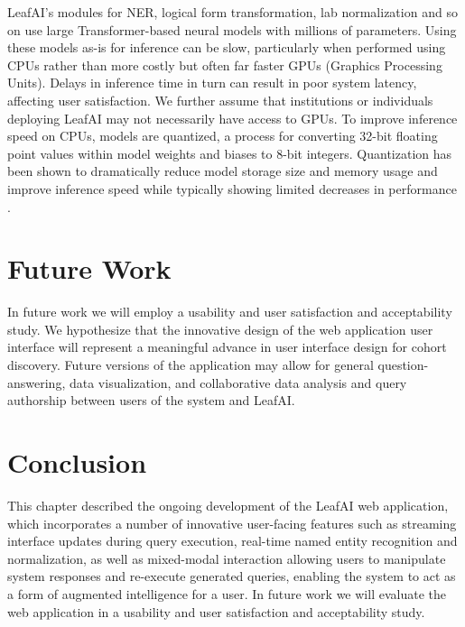 \documentclass[../main.tex]{subfiles}
\begin{document}
LeafAI's modules for NER, logical form transformation, lab normalization and so on use large Transformer-based neural models \cite{vaswani2017attention} with millions of parameters. Using these models as-is for inference can be slow, particularly when performed using CPUs rather than more costly but often far faster GPUs (Graphics Processing Units). Delays in inference time in turn can result in poor system latency, affecting user satisfaction. We further assume that institutions or individuals deploying LeafAI may not necessarily have access to GPUs. To improve inference speed on CPUs, models are quantized, a process for converting 32-bit floating point values within model weights and biases to 8-bit integers. Quantization has been shown to dramatically reduce model storage size and memory usage and improve inference speed while typically showing limited decreases in performance \cite{hubara2017quantized}. 

\section{Future Work}

In future work we will employ a usability and user satisfaction and acceptability study. We hypothesize that the innovative design of the web application user interface will represent a meaningful advance in user interface design for cohort discovery. Future versions of the application may allow for general question-answering, data visualization, and collaborative data analysis and query authorship between users of the system and LeafAI.

\section{Conclusion}

This chapter described the ongoing development of the LeafAI web application, which incorporates a number of innovative user-facing features such as streaming interface updates during query execution, real-time named entity recognition and normalization, as well as mixed-modal interaction allowing users to manipulate system responses and re-execute generated queries, enabling the system to act as a form of augmented intelligence for a user. In future work we will evaluate the web application in a usability and user satisfaction and acceptability study.
\end{document}
